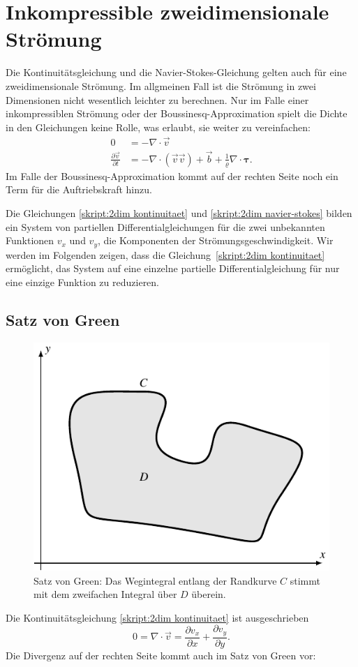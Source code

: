 %
%
%
\section{Inkompressible zweidimensionale Strömung}
Die Kontinuitätsgleichung
und die Navier-Stokes-Gleichung gelten auch für eine zweidimensionale
Strömung.
Im allgmeinen Fall ist die Strömung in zwei Dimensionen nicht wesentlich
leichter zu berechnen.
Nur im Falle einer inkompressiblen Strömung oder der Boussinesq-Approximation
spielt die Dichte in den Gleichungen keine Rolle, was erlaubt,
sie weiter zu vereinfachen:
\begin{align}
0
&=
-\nabla\cdot\vec v
\label{skript:2dim kontinuitaet}
\\
\frac{\partial \vec{v}}{\partial t}
&=
-\nabla\cdot(\vec{v}\vec{v})+\vec b + \frac1{\varrho}\nabla\cdot\bm{\tau}.
\label{skript:2dim navier-stokes}
\end{align}
Im Falle der Boussinesq-Approximation kommt auf der rechten Seite noch
ein Term für die Auftriebskraft hinzu.

Die Gleichungen
\eqref{skript:2dim kontinuitaet}
und
\eqref{skript:2dim navier-stokes}
bilden ein System von partiellen Differentialgleichungen für die zwei
unbekannten Funktionen $v_x$ und $v_y$, die Komponenten der 
Strömungsgeschwindigkeit.
Wir werden im Folgenden zeigen, dass die 
Gleichung~\eqref{skript:2dim kontinuitaet}
ermöglicht, das System auf eine einzelne partielle Differentialgleichung
für nur eine einzige Funktion zu reduzieren.

\subsection{Satz von Green}
\begin{figure}
\centering
\includegraphics{chapters/2/green-curve.pdf}
\caption{Satz von Green: Das Wegintegral entlang der Randkurve $C$
stimmt mit dem zweifachen Integral über $D$ überein.
\label{skript:green-kurve}}
\end{figure}
Die Kontinuitätsgleichung 
\eqref{skript:2dim kontinuitaet}
ist ausgeschrieben
\[
0
=
\nabla\cdot\vec v
=
\frac{\partial v_x}{\partial x} + \frac{\partial v_y}{\partial y}.
\]
Die Divergenz auf der rechten Seite kommt auch im Satz von Green
vor:

